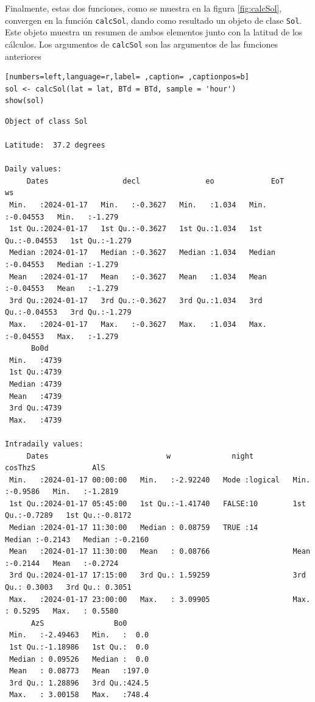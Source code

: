Finalmente, estas dos funciones, como se muestra en la figura \ref{fig:calcSol}, convergen en la función \texttt{calcSol}, dando como resultado un objeto de clase \texttt{Sol}. Este objeto muestra un resumen de ambos elementos junto con la latitud de los cálculos. Los argumentos de \texttt{calcSol} son las argumentos de las funciones anteriores
\begin{lstlisting}[numbers=left,language=r,label= ,caption= ,captionpos=b]
sol <- calcSol(lat = lat, BTd = BTd, sample = 'hour')
show(sol)
\end{lstlisting}

\begin{verbatim}
Object of class Sol 

Latitude:  37.2 degrees

Daily values:
     Dates                 decl               eo             EoT                 ws        
 Min.   :2024-01-17   Min.   :-0.3627   Min.   :1.034   Min.   :-0.04553   Min.   :-1.279  
 1st Qu.:2024-01-17   1st Qu.:-0.3627   1st Qu.:1.034   1st Qu.:-0.04553   1st Qu.:-1.279  
 Median :2024-01-17   Median :-0.3627   Median :1.034   Median :-0.04553   Median :-1.279  
 Mean   :2024-01-17   Mean   :-0.3627   Mean   :1.034   Mean   :-0.04553   Mean   :-1.279  
 3rd Qu.:2024-01-17   3rd Qu.:-0.3627   3rd Qu.:1.034   3rd Qu.:-0.04553   3rd Qu.:-1.279  
 Max.   :2024-01-17   Max.   :-0.3627   Max.   :1.034   Max.   :-0.04553   Max.   :-1.279  
      Bo0d     
 Min.   :4739  
 1st Qu.:4739  
 Median :4739  
 Mean   :4739  
 3rd Qu.:4739  
 Max.   :4739  

Intradaily values: 
     Dates                           w              night            cosThzS             AlS         
 Min.   :2024-01-17 00:00:00   Min.   :-2.92240   Mode :logical   Min.   :-0.9586   Min.   :-1.2819  
 1st Qu.:2024-01-17 05:45:00   1st Qu.:-1.41740   FALSE:10        1st Qu.:-0.7289   1st Qu.:-0.8172  
 Median :2024-01-17 11:30:00   Median : 0.08759   TRUE :14        Median :-0.2143   Median :-0.2160  
 Mean   :2024-01-17 11:30:00   Mean   : 0.08766                   Mean   :-0.2144   Mean   :-0.2724  
 3rd Qu.:2024-01-17 17:15:00   3rd Qu.: 1.59259                   3rd Qu.: 0.3003   3rd Qu.: 0.3051  
 Max.   :2024-01-17 23:00:00   Max.   : 3.09905                   Max.   : 0.5295   Max.   : 0.5580  
      AzS                Bo0       
 Min.   :-2.49463   Min.   :  0.0  
 1st Qu.:-1.18986   1st Qu.:  0.0  
 Median : 0.09526   Median :  0.0  
 Mean   : 0.08773   Mean   :197.0  
 3rd Qu.: 1.28896   3rd Qu.:424.5  
 Max.   : 3.00158   Max.   :748.4
\end{verbatim}


